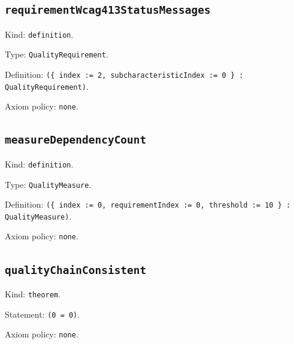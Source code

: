 \documentclass[11pt]{article}
\begin{document}
\subsection*{\texttt{requirementWcag413StatusMessages}}
\noindent Kind: \texttt{definition}.\par
\noindent Type: \texttt{QualityRequirement}.\par
\noindent Definition: \texttt{(\{ index := 2, subcharacteristicIndex := 0 \} : QualityRequirement)}.\par
\noindent Axiom policy: \texttt{none}.\par
\subsection*{\texttt{measureDependencyCount}}
\noindent Kind: \texttt{definition}.\par
\noindent Type: \texttt{QualityMeasure}.\par
\noindent Definition: \texttt{(\{ index := 0, requirementIndex := 0, threshold := 10 \} : QualityMeasure)}.\par
\noindent Axiom policy: \texttt{none}.\par
\subsection*{\texttt{qualityChainConsistent}}
\noindent Kind: \texttt{theorem}.\par
\noindent Statement: \texttt{(0 = 0)}.\par
\noindent Axiom policy: \texttt{none}.\par
\end{document}

